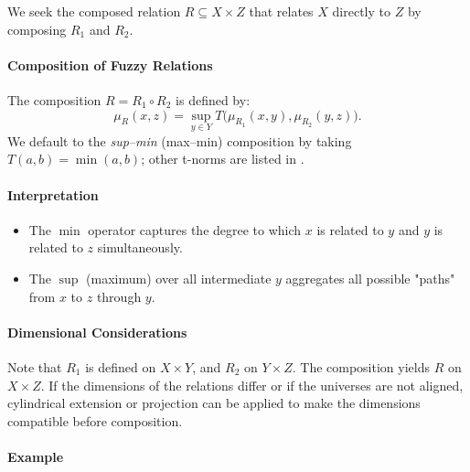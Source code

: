 We seek the composed relation \(R \subseteq X \times Z\) that relates \(X\) directly to \(Z\) by composing \(R_1\) and \(R_2\).

\paragraph{Composition of Fuzzy Relations}

The composition \(R = R_1 \circ R_2\) is defined by:
\begin{equation}
    \mu_R(x, z) = \sup_{y \in Y} T \big( \mu_{R_1}(x, y), \mu_{R_2}(y, z) \big).
    \label{eq:composition_general}
\end{equation}
We default to the \emph{sup--min} (max--min) composition by taking \(T(a,b)=\min(a,b)\); other t\hyp{}norms are listed in .

\paragraph{Interpretation}
\begin{itemize}
    \item The \(\min\) operator captures the degree to which \(x\) is related to \(y\) and \(y\) is related to \(z\) simultaneously.
    \item The \(\sup\) (maximum) over all intermediate \(y\) aggregates all possible "paths" from \(x\) to \(z\) through \(y\).
\end{itemize}

\paragraph{Dimensional Considerations}

Note that \(R_1\) is defined on \(X \times Y\), and \(R_2\) on \(Y \times Z\). The composition yields \(R\) on \(X \times Z\). If the dimensions of the relations differ or if the universes are not aligned, cylindrical extension or projection can be applied to make the dimensions compatible before composition.

\paragraph{Example}

